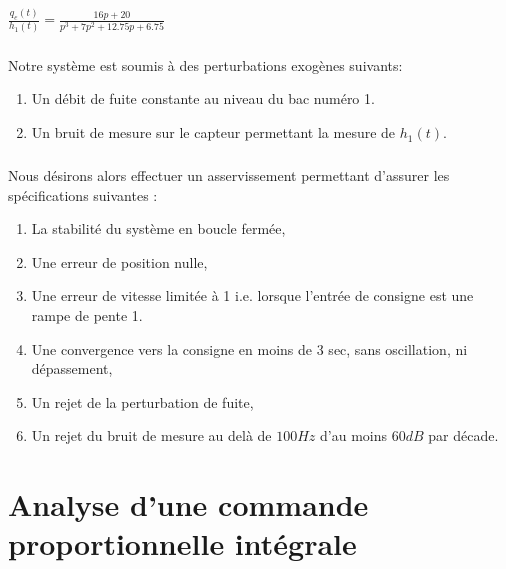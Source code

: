 \documentclass[12pt, a4paper, openany]{report}
\begin{document}
 \begin{Large}
 \begin{center}
 $\frac{q_{e}(t)}{h_{1}(t)}  =  \frac{16p+20}{p^{3}+7p^{2}+12.75p+6.75} $
  \end{center}
 \end{Large}
 
 \paragraph{}   
 Notre système est soumis à des perturbations exogènes suivants:
        
  \begin{enumerate}
      \item Un débit de fuite constante au niveau du bac numéro 1.
      \item Un bruit de mesure sur le capteur permettant la mesure de $h_{1}(t)$.
  \end{enumerate} 
 
 \paragraph{}
 Nous désirons alors effectuer un asservissement permettant d’assurer les spécifications
suivantes :

\begin{enumerate} [label=(\alph*)]
 \item La stabilité du système en boucle fermée,
 \item Une erreur de position nulle,
 \item Une erreur de vitesse limitée à 1 i.e. lorsque l’entrée de consigne est une rampe de
pente 1. 
 \item Une convergence vers la consigne en moins de 3 sec, sans oscillation, ni dépassement,
 \item Un rejet de la perturbation de fuite,
 \item Un rejet du bruit de mesure au delà de\hspace{1mm} $100Hz$ \hspace{1mm}d’au moins\hspace{1mm} $60dB$ \hspace{1mm}par décade.

\end{enumerate} 

\chapter{Analyse d'une commande proportionnelle intégrale}
\end{document}
